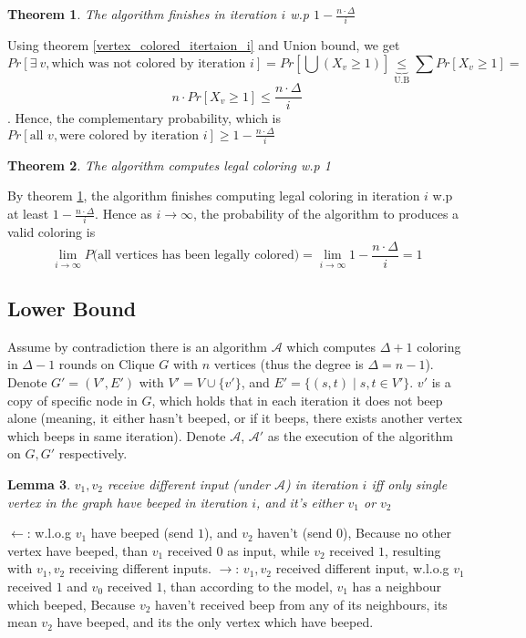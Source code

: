 \documentclass[11pt]{article}
\newtheorem{theorem}{Theorem}[section]
\newtheorem{lemma}[theorem]{Lemma}
\begin{document}
\begin{theorem}
\label{legal_coloring_i}
The algorithm finishes in iteration $i$ w.p $1- \frac{n \cdot \Delta}{i}$
\end{theorem}
Using theorem \ref{vertex_colored_itertaion_i} and Union bound, we get \[
Pr[\exists \: v, \text{which was not colored by iteration } i]=Pr[\bigcup (X_v \ge 1)] \underset {\text{U.B}}{\underbrace{\le}} \sum Pr[X_v \ge 1]= \] \[ n \cdot  Pr[X_v \ge 1] \le 
\frac{n \cdot \Delta}{i} \]
. Hence, the complementary probability, which is $Pr[\text{all } v, \text{were colored by iteration } i] \ge 1- \frac{n \cdot \Delta}{i}$


\begin{theorem}
The algorithm computes legal coloring w.p 1
\end{theorem}
By theorem \ref{legal_coloring_i}, the algorithm finishes computing legal coloring in iteration $i$ w.p at least $1- \frac{n \cdot \Delta}{i}$. Hence as $i \to \infty$, the probability of the algorithm to produces a valid coloring is \[\underset{i\to\infty}{\lim} P(\text{all vertices has been legally colored)}= \underset{i\to\infty}{\lim} 1- \frac{n \cdot \Delta}{i} =  1 \]



\subsection{Lower Bound}
Assume by contradiction there is an algorithm \(\mathcal{A}\) which computes $\Delta+1$ coloring in $\Delta -1$ rounds on Clique $G$ with $n$ vertices (thus the degree is $\Delta=n-1$). Denote $G'=(V',E')$ with $V'=V \cup \{v'\}$, and $E' = \{(s,t) \mid s,t \in V'\}$. $v'$ is a copy of specific node in $G$, which holds that in each iteration it does not beep alone (meaning, it either hasn't beeped, or if it beeps, there exists another vertex which beeps in same iteration).
Denote \(\mathcal{A}\), \(\mathcal{A'}\) as the execution of the algorithm on $G,G'$ respectively.


\begin{lemma}
\label{single_beep_different_input}
$v_1, v_2$ receive different input (under \(\mathcal{A}\)) in iteration $i$ iff only single vertex in the graph have beeped in iteration $i$, and it's either $v_1$ or $v_2$ 
\end{lemma}
$\leftarrow$: w.l.o.g $v_1$ have beeped (send $1$), and $v_2$ haven't (send $0$), Because no other vertex have beeped, than $v_1$ received $0$ as input, while $v_2$ received $1$, resulting with $v_1,v_2$ receiving different inputs.
\newline
$\rightarrow$: $v_1, v_2$ received different input, w.l.o.g $v_1$ received $1$ and $v_0$ received $1$, than according to the model, $v_1$ has a neighbour which beeped, Because $v_2$ haven't received beep from any of its neighbours, its mean $v_2$ have beeped, and its the only vertex which have beeped.
\end{document}
